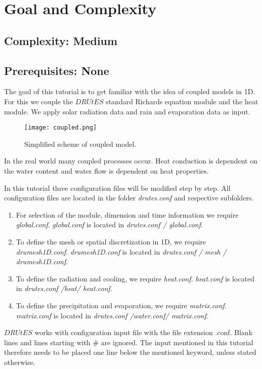 \documentclass[
10pt, %
a4paper, %
oneside, %
headinclude,footinclude, %
BCOR5mm, %
]{scrartcl}
\begin{document}
\section{Goal and Complexity}
\subsection*{Complexity: Medium}

\subsection*{Prerequisites: None}

The goal of this tutorial is to get familiar with the idea of coupled models in 1D. For this we couple the $DRUtES$ standard Richards equation module and the heat module. We apply solar radiation data and rain and evaporation data as input.

\begin{figure}[!h]
\centering
\texttt{[image: coupled.png]}
\caption{Simplified scheme of coupled model.}
\end{figure}

In the real world many coupled processes occur. Heat conduction is dependent on the water content and water flow is dependent on heat properties. 

In this tutorial three configuration files will be modified step by step. All configuration files are located in the folder \emph{drutes.conf} and respective subfolders. \begin{enumerate}
\item For selection of the module, dimension and time information we require \emph{global.conf}.  \emph{global.conf} is located in \emph{drutes.conf / global.conf}. 
\item To define the mesh or spatial discretization in 1D,  we require \emph{drumesh1D.conf}. \emph{drumesh1D.conf} is located in \emph{drutes.conf / mesh / drumesh1D.conf}. 
\item To define the radiation and cooling, we require \emph{heat.conf}. \emph{heat.conf} is located in \emph{drutes.conf /heat/ heat.conf}. 
\item To define the precipitation and evaporation, we require \emph{matrix.conf}. \emph{matrix.conf} is located in \emph{drutes.conf /water.conf/ matrix.conf}. 
\end{enumerate}
$DRUtES$ works with configuration input file with the file extension .conf. Blank lines and lines starting with \# are ignored. The input mentioned in this tutorial therefore needs to be placed one line below the mentioned keyword, unless stated otherwise. 
\end{document}
